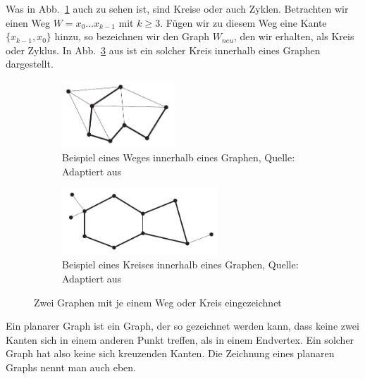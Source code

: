 \documentclass[12pt, a4paper]{article}
\begin{document}
Was in Abb.~\ref{example_graph_way_diestel} auch zu sehen ist, sind Kreise oder auch Zyklen. Betrachten wir einen Weg $W = x_0\dots x_{k-1}$ mit $k \geq 3$. Fügen wir zu diesem Weg eine Kante $\{x_{k-1}, x_0\}$ hinzu, so bezeichnen wir den Graph $W_{neu}$, den wir erhalten, als Kreis oder Zyklus. In Abb.~\ref{example_graph_cycle_diestel} aus  ist ein solcher Kreis innerhalb eines Graphen dargestellt.\\

\begin{figure}[h!]
\centering
\begin{subfigure}[t]{0.45\textwidth}
\includegraphics[height=2.5cm]{example_graph_way_diestel.png}
\caption[Beispiel eines Weges innerhalb eines Graphen]{Beispiel eines Weges innerhalb eines Graphen, Quelle: Adaptiert aus \protect{}}
\label{example_graph_way_diestel}
\end{subfigure}
\begin{subfigure}[t]{0.45\textwidth}
\includegraphics[height=2.5cm]{example_graph_cycle_diestel.png}
\caption[Beispiel eines Kreises innerhalb eines Graphen]{Beispiel eines Kreises innerhalb eines Graphen, Quelle: Adaptiert aus \protect{}}
\label{example_graph_cycle_diestel}
\end{subfigure}
\caption{Zwei Graphen mit je einem Weg oder Kreis eingezeichnet}
\end{figure}

Ein planarer Graph ist ein Graph, der so gezeichnet werden kann, dass keine zwei Kanten sich in einem anderen Punkt treffen, als in einem Endvertex. Ein solcher Graph hat also keine sich kreuzenden Kanten. Die Zeichnung eines planaren Graphs nennt man auch eben.\\
\end{document}
